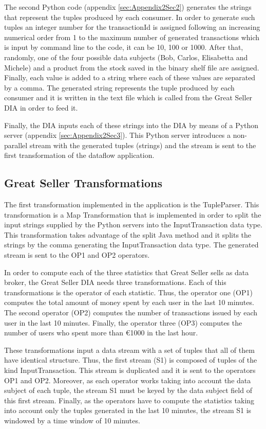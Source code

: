 The second Python code (appendix \ref{sec:Appendix2Sec2}) generates the strings that represent the tuples produced by each consumer. In order to generate such tuples an integer number for the transactionId is assigned following an increasing numerical order from 1 to the maximum number of generated transactions which is input by command line to the code, it can be 10, 100 or 1000. After that, randomly, one of the four possible data subjects (Bob, Carlos, Elisabetta and Michele) and a product from the stock saved in the binary shelf file are assigned. Finally, each value is added to a string where each of these values are separated by a comma. The generated string represents the tuple produced by each consumer and it is written in the text file which is called from the Great Seller DIA in order to feed it.

Finally, the DIA inputs each of these strings into the DIA by means of a Python server (appendix \ref{sec:Appendix2Sec3}). This Python server introduces a non-parallel stream with the generated tuples (strings) and the stream is sent to the first transformation of the dataflow application.

\subsection{Great Seller Transformations}

The first transformation implemented in the application is the TupleParser. This transformation is a Map Transformation that is implemented in order to split the input strings supplied by the Python servers into the InputTransaction data type. This transformation takes advantage of the split Java method and it splits the strings by the comma generating the InputTransaction data type. The generated stream is sent to the OP1 and OP2 operators.

In order to compute each of the three statistics that Great Seller sells as data broker, the Great Seller DIA needs three transformations. Each of this transformations is the operator of each statistic. Thus, the operator one (OP1) computes the total amount of money spent by each user in the last 10 minutes. The second operator (OP2) computes the number of transactions issued by each user in the last 10 minutes. Finally, the operator three (OP3) computes the number of users who spent more than \euro{1000} in the last hour.

These transformations input a data stream with a set of tuples that all of them have identical structure. Thus, the first stream (S1) is composed of tuples of the kind InputTransaction. This stream is duplicated and it is sent to the operators OP1 and OP2. Moreover, as each operator works taking into account the data subject of each tuple, the stream S1 must be keyed by the data subject field of this first stream. Finally, as the operators have to compute the statistics taking into account only the tuples generated in the last 10 minutes, the stream S1 is windowed by a time window of 10 minutes.

